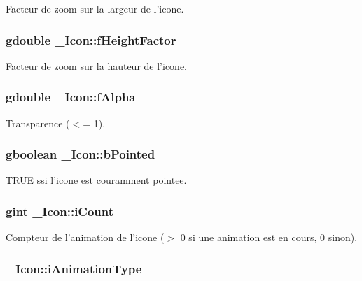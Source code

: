 Facteur de zoom sur la largeur de l'icone. 

\subsubsection{\setlength{\rightskip}{0pt plus 5cm}gdouble {\bf \_\-Icon::fHeightFactor}}\label{struct__Icon_108dcb6efa468923cb16bd2bdf93556e}


Facteur de zoom sur la hauteur de l'icone. 

\subsubsection{\setlength{\rightskip}{0pt plus 5cm}gdouble {\bf \_\-Icon::fAlpha}}\label{struct__Icon_277c82817050d173831fee24327c4020}


Transparence ($<$= 1). 

\subsubsection{\setlength{\rightskip}{0pt plus 5cm}gboolean {\bf \_\-Icon::bPointed}}\label{struct__Icon_477df6868e6077e74f348fd2a773fd2a}


TRUE ssi l'icone est couramment pointee. 

\subsubsection{\setlength{\rightskip}{0pt plus 5cm}gint {\bf \_\-Icon::iCount}}\label{struct__Icon_470706f7184913004a81a32c0c96ff40}


Compteur de l'animation de l'icone ($>$ 0 si une animation est en cours, 0 sinon). 

\subsubsection{ {\bf \_\-Icon::iAnimationType}}\label{struct__Icon_f6f5d75a4d7bc97ffd1698c5b9f228c9}



